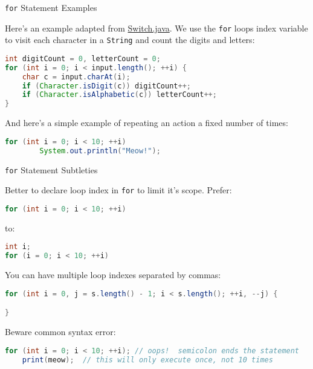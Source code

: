 \documentclass{beamer}
\newcommand{\code}{http://www.cc.gatech.edu/~simpkins/teaching/gatech/cs1331/code}
\begin{document}
\begin{frame}[fragile]{{\tt for} Statement Examples}


Here's an example adapted from  \href{\code/Switch.java}{Switch.java}.  We use the {\tt for} loops index variable to visit each character in a {\tt String} and count the digits and letters:
\begin{lstlisting}[language=Java]
int digitCount = 0, letterCount = 0;
for (int i = 0; i < input.length(); ++i) {
    char c = input.charAt(i);
    if (Character.isDigit(c)) digitCount++;
    if (Character.isAlphabetic(c)) letterCount++;
}
\end{lstlisting}

And here's a simple example of repeating an action a fixed number of times:
\begin{lstlisting}[language=Java]
for (int i = 0; i < 10; ++i)
        System.out.println("Meow!");
\end{lstlisting}



\end{frame}

\begin{frame}[fragile]{{\tt for} Statement Subtleties}


Better to declare loop index in {\tt for} to limit it's scope.  Prefer:
\begin{lstlisting}[language=Java]
for (int i = 0; i < 10; ++i)
\end{lstlisting}
to:
\begin{lstlisting}[language=Java]
int i;
for (i = 0; i < 10; ++i)
\end{lstlisting}

You can have multiple loop indexes separated by commas:
\begin{lstlisting}[language=Java]
for (int i = 0, j = s.length() - 1; i < s.length(); ++i, --j) {

}
\end{lstlisting}
Beware common syntax error:
\begin{lstlisting}[language=Java]
for (int i = 0; i < 10; ++i); // oops!  semicolon ends the statement
    print(meow);  // this will only execute once, not 10 times
\end{lstlisting}


\end{frame}
\end{document}
